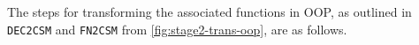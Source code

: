 \documentclass[ oneside,%
                    author={James Elgar},
                    degree={MEng},
                     title={Bidirectional transformer between functional and \\ object-oriented programming in Rust},
                  subtitle={}]{dissertation}
\begin{document}



The steps for transforming the associated functions in OOP, as outlined in \verb|DEC2CSM| and \verb|FN2CSM| from \autoref{fig:stage2-trans-oop}, are as follows.
\end{document}
